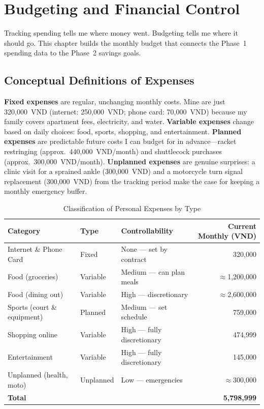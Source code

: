 \chapter{Budgeting and Financial Control}

Tracking spending tells me where money went. Budgeting tells me where it should go. This chapter builds the monthly budget that connects the Phase~1 spending data to the Phase~2 savings goals.

\section{Conceptual Definitions of Expenses}

\textbf{Fixed expenses} are regular, unchanging monthly costs. Mine are just 320,000~VND (internet: 250,000~VND; phone card: 70,000~VND) because my family covers apartment fees, electricity, and water. \textbf{Variable expenses} change based on daily choices: food, sports, shopping, and entertainment. \textbf{Planned expenses} are predictable future costs I can budget for in advance---racket restringing (approx.\ 440,000~VND/month) and shuttlecock purchases (approx.\ 300,000~VND/month). \textbf{Unplanned expenses} are genuine surprises: a clinic visit for a sprained ankle (300,000~VND) and a motorcycle turn signal replacement (300,000~VND) from the tracking period make the case for keeping a monthly emergency buffer.

\begin{table}[h!]
\caption{Classification of Personal Expenses by Type}
\label{tab:expense_classification}
\begin{tabularx}{\linewidth}{@{}p{3cm}p{1.8cm}Xr@{}}
\toprule
\textbf{Category} & \textbf{Type} & \textbf{Controllability} & \textbf{Current Monthly (VND)} \\
\midrule
Internet \& Phone Card  & Fixed    & None --- set by contract    & 320,000   \\
Food (groceries)        & Variable & Medium --- can plan meals   & $\approx$1,200,000 \\
Food (dining out)       & Variable & High --- discretionary      & $\approx$2,600,000 \\
Sports (court \& equipment) & Planned & Medium --- set schedule  & 759,000   \\
Shopping online         & Variable & High --- fully discretionary & 474,999  \\
Entertainment           & Variable & High --- fully discretionary & 145,000  \\
Unplanned (health, moto) & Unplanned & Low --- emergencies       & $\approx$300,000 \\
\midrule
\textbf{Total} & & & \textbf{5,798,999} \\
\bottomrule
\end{tabularx}
\end{table}


